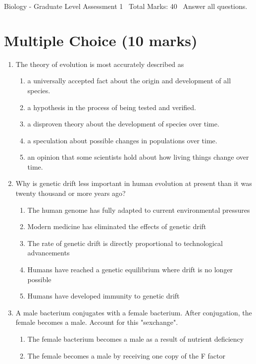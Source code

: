 \documentclass[12pt]{article}
\begin{document}
\begin{center}
Biology - Graduate Level Assessment 1 \
Total Marks: 40 \
Answer all questions.
\end{center}

\section*{Multiple Choice (10 marks)}
\begin{enumerate}[label=\arabic*.]
\item The theory of evolution is most accurately described as
\begin{enumerate}[label=(\alph*)]
    \item a universally accepted fact about the origin and development of all species.
    \item a hypothesis in the process of being tested and verified.
    \item a disproven theory about the development of species over time.
    \item a speculation about possible changes in populations over time.
    \item an opinion that some scientists hold about how living things change over time.
\end{enumerate}
\item Why is genetic drift less important in human evolution at present than it was twenty
thousand or more years ago?
\begin{enumerate}[label=(\alph*)]
    \item The human genome has fully adapted to current environmental pressures
    \item Modern medicine has eliminated the effects of genetic drift
    \item The rate of genetic drift is directly proportional to technological advancements
    \item Humans have reached a genetic equilibrium where drift is no longer possible
    \item Humans have developed immunity to genetic drift
\end{enumerate}
\item A male bacterium conjugates with a female bacterium. After conjugation, the female becomes
a male. Account for this "sexchange".
\begin{enumerate}[label=(\alph*)]
    \item The female bacterium becomes a male as a result of nutrient deficiency
    \item The female becomes a male by receiving one copy of the F factor

\end{enumerate}
\end{enumerate}
\end{document}
